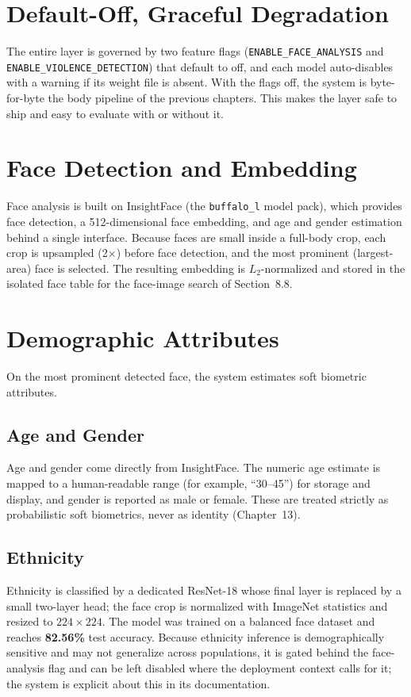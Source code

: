 \documentclass[12pt]{report}
\begin{document}
\section{Default-Off, Graceful Degradation}
The entire layer is governed by two feature flags (\texttt{ENABLE\_FACE\_ANALYSIS} and \texttt{ENABLE\_VIOLENCE\_DETECTION}) that default to off, and each model auto-disables with a warning if its weight file is absent. With the flags off, the system is byte-for-byte the body pipeline of the previous chapters. This makes the layer safe to ship and easy to evaluate with or without it.

\section{Face Detection and Embedding}
Face analysis is built on InsightFace (the \texttt{buffalo\_l} model pack), which provides face detection, a 512-dimensional face embedding, and age and gender estimation behind a single interface. Because faces are small inside a full-body crop, each crop is upsampled (2$\times$) before face detection, and the most prominent (largest-area) face is selected. The resulting embedding is $L_2$-normalized and stored in the isolated face table for the face-image search of Section~8.8.

\section{Demographic Attributes}
On the most prominent detected face, the system estimates soft biometric attributes.

\subsection{Age and Gender}
Age and gender come directly from InsightFace. The numeric age estimate is mapped to a human-readable range (for example, ``30--45'') for storage and display, and gender is reported as male or female. These are treated strictly as probabilistic soft biometrics, never as identity (Chapter~13).

\subsection{Ethnicity}
Ethnicity is classified by a dedicated ResNet-18 whose final layer is replaced by a small two-layer head; the face crop is normalized with ImageNet statistics and resized to $224 \times 224$. The model was trained on a balanced face dataset and reaches \textbf{82.56\%} test accuracy. Because ethnicity inference is demographically sensitive and may not generalize across populations, it is gated behind the face-analysis flag and can be left disabled where the deployment context calls for it; the system is explicit about this in its documentation.
\end{document}
